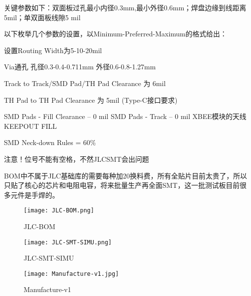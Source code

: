 关键参数如下：双面板过孔最小内径0.3mm,最小外径0.6mm；焊盘边缘到线距离 5mil；单双面板线隙5 mil

以下枚举几个参数的设置，以Minimum-Preferred-Maximum的格式给出：

设置Routing Width为5-10-20mil

Via通孔 孔径0.3-0.4-0.711mm 外径0.6-0.8-1.27mm

Track to Track/SMD Pad/TH Pad Clearance 为 6mil

TH Pad to TH Pad Clearance 为 5mil (Type-C接口要求)

SMD Pads - Fill Clearance -- 0 mil   SMD Pads - Track -- 0 mil     XBEE模块的天线KEEPOUT FILL

SMD Neck-down Rules = 60\%

注意！位号不能有空格，不然JLCSMT会出问题

BOM中不属于JLC基础库的需要每种加20换料费，所有全贴片目前太贵了，所以只贴了核心的芯片和电阻电容，将来批量生产再全面SMT，这一批测试板目前很多元件是手焊的。


\begin{figure}[htbp]
    \centering
    \texttt{[image: JLC-BOM.png]}
    \caption{JLC-BOM}
    \label{fig:JLC-BOM}
\end{figure}

\begin{figure}[htbp]
    \centering
    \texttt{[image: JLC-SMT-SIMU.png]}
    \caption{JLC-SMT-SIMU}
    \label{fig:JLC-SMT-SIMU}
\end{figure}

\begin{figure}[htbp]
    \centering
    \texttt{[image: Manufacture-v1.jpg]}
    \caption{Manufacture-v1}
    \label{fig:Manufacture-v1}
\end{figure}
